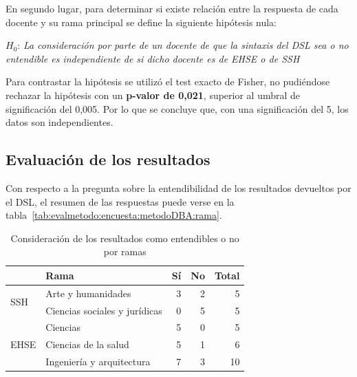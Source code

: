 En segundo lugar, para determinar si existe relación entre la respuesta de cada docente y su rama principal se define la siguiente hipótesis nula:

\medskip
\begin{mdframed}[style=hipotesis0]
$H_0$: \emph{La consideración por parte de un docente de que la sintaxis del DSL sea o no entendible es independiente de si dicho docente es de EHSE o de SSH}
\end{mdframed}

\medskip
Para contrastar la hipótesis se utilizó el test exacto de Fisher, no pudiéndose rechazar la hipótesis con un \textbf{p-valor de 0,021}, superior al umbral de significación del 0,005. Por lo que se concluye que, con una significación del 5\percentage, los datos son independientes.

\subsection{Evaluación de los resultados}

Con respecto a la pregunta sobre la entendibilidad de los resultados devueltos por el DSL, el resumen de las respuestas puede verse en la tabla~\ref{tab:evalmetodo:encuesta:metodoDBA:rama}.

\begin{table}[H]
  \begin{center}
  \begin{tabular}{| l | l | r | r | r |}
    \hline
    & Rama & Sí & No & Total \\
    \hline
    \hline
    \multirow{2}{2.5cm}{SSH} & Arte y humanidades & 3 & 2 & 5  \\
    \cline{2-5}
    & Ciencias sociales y jurídicas & 0 & 5 & 5  \\
    \hline
    \multirow{3}{2.5cm}{EHSE} & Ciencias & 5 & 0 & 5  \\
    \cline{2-5}
    & Ciencias de la salud & 5 & 1 & 6  \\
    \cline{2-5}
    & Ingeniería y arquitectura & 7 & 3 & 10 \\
    \hline
  \end{tabular}
\end{center}
\caption{Consideración de los resultados como entendibles o no por ramas}
\label{tab:evalmetodo:encuesta:resultados:rama}
\end{table}

